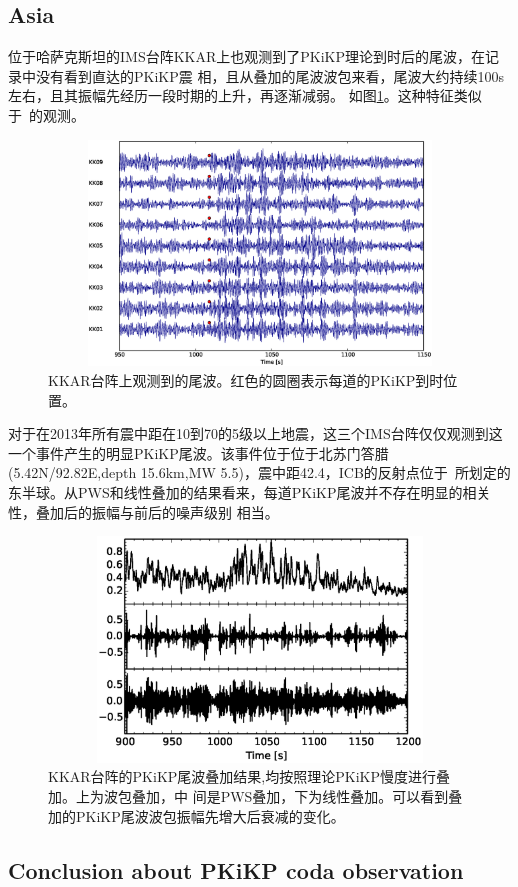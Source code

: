 \subsection{Asia}

位于哈萨克斯坦的IMS台阵KKAR上也观测到了PKiKP理论到时后的尾波，在记录中没有看到直达的PKiKP震
相，且从叠加的尾波波包来看，尾波大约持续100s左右，且其振幅先经历一段时期的上升，再逐渐减弱。
如图\ref{kkar_coda}。这种特征类似于~\cite{Vidale2000}的观测。

\begin{figure}[!ht]
	\centering
	\includegraphics[width=12cm,height=6cm]{fig/chap3/kkar_sec.eps}
	\caption{KKAR台阵上观测到的尾波。红色的圆圈表示每道的PKiKP到时位置。}
	\label{kkar_coda}
\end{figure}

对于在2013年所有震中距在10{\textdegree}到70{\textdegree}的5级以上地震，这三个IMS台阵仅仅观测到这一个事件产生的明显PKiKP尾波。该事件位于位于北苏门答腊(5.42N/92.82E,depth 15.6km,MW 5.5)，震中距42.4{\textdegree}，ICB的反射点位于~\cite{Tanaka1997}所划定的东半球。从PWS和线性叠加的结果看来，每道PKiKP尾波并不存在明显的相关性，叠加后的振幅与前后的噪声级别
相当。

\begin{figure}[!ht]
	\centering
	\includegraphics[width=12cm,height=6cm]{fig/chap3/kkar_mul.eps}
	\caption{KKAR台阵的PKiKP尾波叠加结果,均按照理论PKiKP慢度进行叠加。上为波包叠加，中%
间是PWS叠加，下为线性叠加。可以看到叠加的PKiKP尾波波包振幅先增大后衰减的变化。}
\end{figure}

\subsection{Conclusion about PKiKP coda observation}



